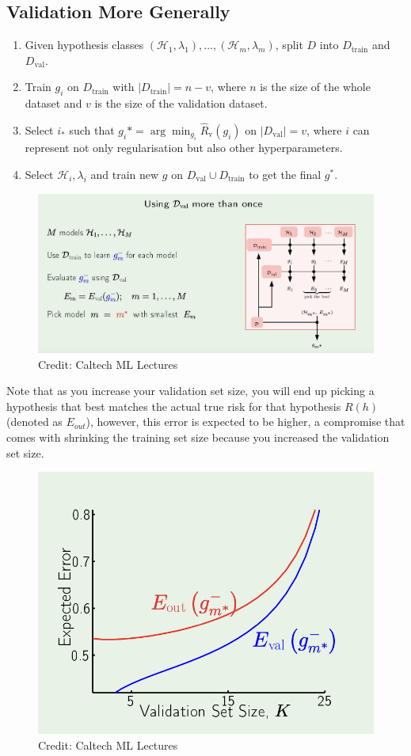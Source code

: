 \subsection*{Validation More Generally}

\begin{enumerate}
  \item Given hypothesis classes \( (\mathcal{H}_1, \lambda_1), \ldots, (\mathcal{H}_m, \lambda_m) \), split \( D \) into \( D_{\text{train}} \) and \( D_{\text{val}} \).
  \item Train \( g_i \) on \( D_{\text{train}} \) with \( |D_{\text{train}}| = n - v \), where $n$ is the size of the whole dataset and $v$ is the size of the validation dataset.
  \item Select \( i_* \) such that \( g_i* = \arg\min_{g_i} \hat{R}_{\text{v}}(g_i) \) on \( |D_{\text{val}}| = v \), where \( i \) can represent not only regularisation but also other hyperparameters.
  \item Select \( \mathcal{H}_i, \lambda_i \) and train new \( g \) on \( D_{\text{val}} \cup D_{\text{train}} \) to get the final \( g^* \).
\end{enumerate}

\begin{figure}[H]
    \centering
    \includegraphics[width=0.75\linewidth]{img/validation.png}
    \caption{Credit: Caltech ML Lectures}
    
\end{figure}


Note that as you increase your validation set size, you will end up picking a hypothesis that best matches the actual true risk for that hypothesis $R(h)$ (denoted as $E_{out}$), however, this error is expected to be higher, a compromise that comes with shrinking the training set size because you increased the validation set size.

\begin{figure}[H]
    \centering
    \includegraphics[width=0.5\linewidth]{img/bias_validation.png}
    \caption{Credit: Caltech ML Lectures}
    
\end{figure}

